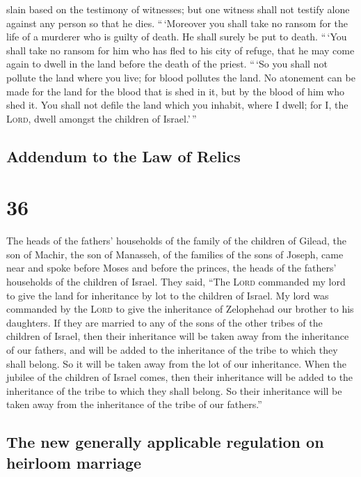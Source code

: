 slain based on the testimony of witnesses; but one witness shall not
testify alone against any person so that he dies. 
``\,`Moreover you shall take no ransom for the life of a murderer who is
guilty of death. He shall surely be put to death. 
``\,`You shall take no ransom for him who has fled to his city of
refuge, that he may come again to dwell in the land before the death of
the priest.  ``\,`So you shall not pollute the land where
you live; for blood pollutes the land. No atonement can be made for the
land for the blood that is shed in it, but by the blood of him who shed
it.  You shall not defile the land which you inhabit,
where I dwell; for I, the \textsc{Lord}, dwell amongst the children of
Israel.'\,''

\hypertarget{addendum-to-the-law-of-relics}{%
\subsection{Addendum to the Law of
Relics}\label{addendum-to-the-law-of-relics}}

\hypertarget{section-35}{%
\section{36}\label{section-35}}

 The heads of the fathers' households of the family of the
children of Gilead, the son of Machir, the son of Manasseh, of the
families of the sons of Joseph, came near and spoke before Moses and
before the princes, the heads of the fathers' households of the children
of Israel.  They said, ``The \textsc{Lord} commanded my
lord to give the land for inheritance by lot to the children of Israel.
My lord was commanded by the \textsc{Lord} to give the inheritance of
Zelophehad our brother to his daughters.  If they are
married to any of the sons of the other tribes of the children of
Israel, then their inheritance will be taken away from the inheritance
of our fathers, and will be added to the inheritance of the tribe to
which they shall belong. So it will be taken away from the lot of our
inheritance.  When the jubilee of the children of Israel
comes, then their inheritance will be added to the inheritance of the
tribe to which they shall belong. So their inheritance will be taken
away from the inheritance of the tribe of our fathers.''

\hypertarget{the-new-generally-applicable-regulation-on-heirloom-marriage}{%
\subsection{The new generally applicable regulation on heirloom
marriage}\label{the-new-generally-applicable-regulation-on-heirloom-marriage}}


